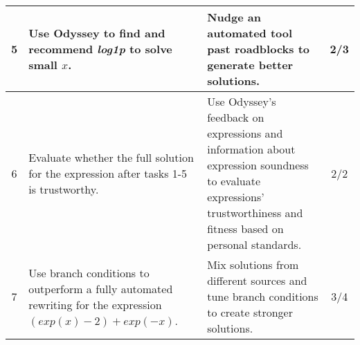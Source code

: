 \begin{tabular}{|c|p{5cm}|p{6cm}|c|}
  \hline
  5 & Use Odyssey to find and recommend \textit{log1p} to solve small $x$.
  & Nudge an automated tool past roadblocks to generate better solutions.
  & 2/3 \\
  \hline
  6 & Evaluate whether the full solution for the expression after tasks 1-5 is trustworthy.
  & Use Odyssey's feedback on expressions and information about expression soundness to 
  evaluate expressions' trustworthiness and fitness based on personal standards.
  & 2/2 \\
  \hline
  7 & Use branch conditions to outperform a fully automated rewriting for the expression
  $(exp(x)-2) + exp(-x)$. & Mix solutions from different sources and tune branch conditions
  to create stronger solutions. 
  & 3/4 \\
  \hline
\end{tabular}
